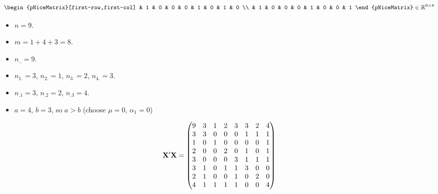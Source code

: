 \begin{Example}{}{}
\[\begin{pNiceMatrix}[first-row,first-col]
             & 1   & 0        & 0        & 0        & 1        & 0       & 1       & 0       \\
             & 1   & 0        & 0        & 0        & 1        & 0       & 0       & 1
        \end{pNiceMatrix}\in\R^{9\times 8} \]
    \begin{itemize}
        \item $ n=9 $.
        \item $ m=1+4+3=8 $.
        \item $ n_{..}=9 $.
        \item $ n_{1.}=3 $, $ n_{2.}=1 $, $ n_{3.}=2 $, $ n_{4.}=3 $.
        \item $ n_{.1}=3 $, $ n_{.2}=2 $, $ n_{.3}=4 $.
        \item $ a=4 $, $ b=3 $, so $ a>b $ (choose $ \mu=0 $, $ \alpha_1=0 $)
    \end{itemize}
    \[ \mathbf{X}'\mathbf{X}=\begin{pmatrix}
            9 & 3 & 1 & 2 & 3 & 3 & 2 & 4 \\
            3 & 3 & 0 & 0 & 0 & 1 & 1 & 1 \\
            1 & 0 & 1 & 0 & 0 & 0 & 0 & 1 \\
            2 & 0 & 0 & 2 & 0 & 1 & 0 & 1 \\
            3 & 0 & 0 & 0 & 3 & 1 & 1 & 1 \\
            3 & 1 & 0 & 1 & 1 & 3 & 0 & 0 \\
            2 & 1 & 0 & 0 & 1 & 0 & 2 & 0 \\
            4 & 1 & 1 & 1 & 1 & 0 & 0 & 4
        \end{pmatrix} \]
\end{Example}
